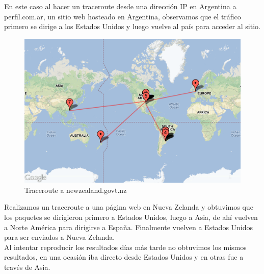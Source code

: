 En este caso al hacer un traceroute desde una dirección IP en Argentina a perfil.com.ar, un sitio web hosteado en Argentina, observamos que el tráfico primero se dirige a los Estados Unidos y luego vuelve al país para acceder al sitio.

\begin{figure}[H]
\begin{center}
\includegraphics[width=17cm]{newzealand.png}
\end{center}
\caption{Traceroute a newzealand.govt.nz} \label{figura1}
\end{figure}

Realizamos un traceroute a una página web en Nueva Zelanda y obtuvimos que los paquetes se dirigieron primero a Estados Unidos, luego a Asia, de ahí vuelven a Norte América para dirigirse a España. Finalmente vuelven a Estados Unidos para ser enviados a Nueva Zelanda.	\\
\indent	Al intentar reproducir los resultados días más tarde no obtuvimos los mismos resultados, en una ocasión iba directo desde Estados Unidos y en otras fue a través de Asia.
